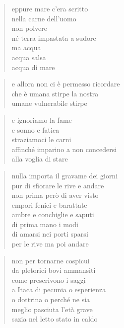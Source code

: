 
	\begin{verse}
		eppure mare c’era scritto\\
		nella carne dell’uomo\\
		non polvere\\
		né terra impastata a sudore\\
		ma acqua\\
		acqua salsa\\
		acqua di mare
	\end{verse}

	\begin{verse}
		e allora non ci è permesso ricordare\\
		che è umana stirpe la nostra\\
		umane vulnerabile stirpe
	\end{verse}

	\begin{verse}
		e ignoriamo la fame\\
		e sonno e fatica\\
		straziamoci le carni\\
		affinché imparino a non concedersi\\
		alla voglia di stare
	\end{verse}

	\begin{verse}
		nulla importa il gravame dei giorni\\
		pur di sfiorare le rive e andare\\
		non prima però di aver visto\\
		empori fenici e barattate\\
		ambre e conchiglie e saputi\\
		di prima mano i modi\\
		di amarsi nei porti sparsi\\
		per le rive ma poi andare
	\end{verse}

	\begin{verse}
		non per tornarne cospicui\\
		da pletorici bovi ammansiti\\
		come prescrivono i saggi\\
		a Itaca di pecunia o esperienza\\
		o dottrina o perché ne sia\\
		meglio pasciuta l’età grave\\
		sazia nel letto stato in caldo
	\end{verse}

